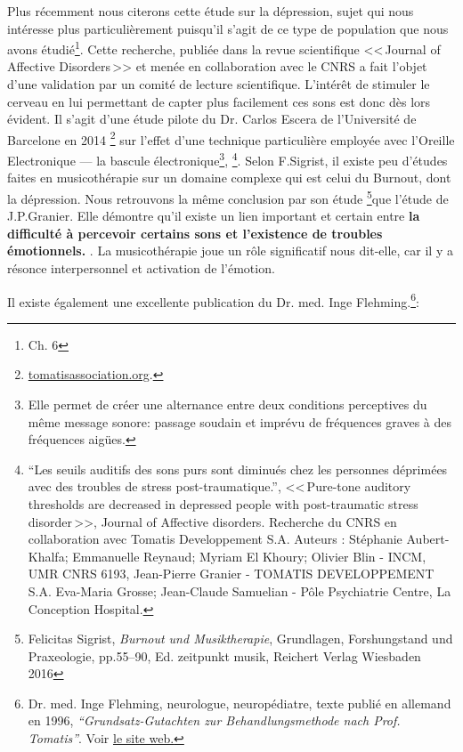 Plus récemment nous citerons cette étude sur la dépression, sujet qui nous intéresse plus particulièrement puisqu'il s'agit de ce type de population que nous avons étudié\footnote{Ch. 6}. Cette recherche, publiée dans la revue scientifique <<\,Journal
of Affective Disorders\,>> et menée en collaboration avec le CNRS a fait l'objet d'une validation
par un comité de lecture scientifique. 
L'intérêt de stimuler
le cerveau en lui permettant de capter plus facilement ces sons est
donc dès lors évident. Il s'agit d'une étude pilote du Dr. Carlos Escera
de l'Université de Barcelone en 2014%
\footnote{%
\href{http://tomatisassociation.org/scientific-validation-of-the-tomatis-effect-eeg-recordings-of-sound-from-brainstem-to-cerebral-cortex-encoding-university-of-barcelona-2014/}{tomatisassociation.org}.} sur l'effet d'une technique particulière employée avec l'Oreille Electronique
--- la bascule \label{bascule} électronique\footnote{Elle permet de créer une alternance entre deux conditions perceptives du même message sonore: passage soudain et imprévu de fréquences graves à des fréquences aigües.},%
\footnote{``Les seuils auditifs des sons purs 
		sont diminués chez les personnes déprimées avec des
		troubles de stress post-traumatique.'', <<\,Pure-tone auditory thresholds are decreased in depressed people with post-traumatic stress disorder\,>>, Journal of Affective disorders. Recherche du CNRS en collaboration
		avec Tomatis Developpement S.A. Auteurs : Stéphanie Aubert-Khalfa; Emmanuelle Reynaud; Myriam El Khoury;
		Olivier Blin - INCM, UMR CNRS 6193, Jean-Pierre Granier -
		TOMATIS DEVELOPPEMENT S.A. Eva-Maria Grosse; Jean-Claude Samuelian - Pôle Psychiatrie Centre, La Conception Hospital.}.
Selon F.Sigrist, il existe peu d'études faites en musicothérapie sur un domaine complexe qui est celui du Burnout, dont la dépression. Nous retrouvons la même conclusion par son étude \footnote{Felicitas Sigrist,  \textit{Burnout und Musiktherapie}, Grundlagen, Forshungstand und Praxeologie, pp.55--90, Ed. zeitpunkt musik, Reichert Verlag Wiesbaden 2016}que l'étude  de J.P.Granier. Elle démontre qu'il existe
un lien important et certain entre \textbf{la difficulté à percevoir
	certains sons et l'existence de troubles émotionnels. }. La musicothérapie joue un rôle significatif nous dit-elle, car il y a résonce interpersonnel et activation de l'émotion.



Il existe également une excellente  publication du Dr. med. Inge Flehming.\footnote{Dr. med. Inge Flehming,
	neurologue, neuropédiatre, texte publié en allemand
	en 1996, \emph{``Grundsatz-Gutachten zur Behandlungsmethode
	nach Prof. Tomatis''}. Voir \href{http://www.analytische-hoertherapie.de/uploads/tx\_templavoila/Grundsatzgutachten\_zur\_Behandlungsmethode\_nach\_Prof.\_Tomatis.pdf}{le site web.}}:



